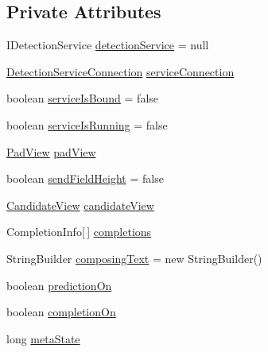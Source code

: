 \subsection*{Private Attributes}
\begin{DoxyCompactItemize}
\item 
IDetectionService \hyperlink{classch_1_1zhaw_1_1ba10__bsha__1_1_1ime_1_1HandwritingIME_adb6575df144036d95d8e2fb029218c4d}{detectionService} = null
\item 
\hyperlink{classch_1_1zhaw_1_1ba10__bsha__1_1_1ime_1_1HandwritingIME_1_1DetectionServiceConnection}{DetectionServiceConnection} \hyperlink{classch_1_1zhaw_1_1ba10__bsha__1_1_1ime_1_1HandwritingIME_a327839f818f5782ff037e64ff386045f}{serviceConnection}
\item 
boolean \hyperlink{classch_1_1zhaw_1_1ba10__bsha__1_1_1ime_1_1HandwritingIME_a9d9ecc20c8af30a04dfaa832cd7da89b}{serviceIsBound} = false
\item 
boolean \hyperlink{classch_1_1zhaw_1_1ba10__bsha__1_1_1ime_1_1HandwritingIME_a2ec39f4494a222882ffb6a09419accd8}{serviceIsRunning} = false
\item 
\hyperlink{classch_1_1zhaw_1_1ba10__bsha__1_1_1ime_1_1PadView}{PadView} \hyperlink{classch_1_1zhaw_1_1ba10__bsha__1_1_1ime_1_1HandwritingIME_a1dd0d971c8e7acd463435307af0b6bcd}{padView}
\item 
boolean \hyperlink{classch_1_1zhaw_1_1ba10__bsha__1_1_1ime_1_1HandwritingIME_a25083961cde3a46e105a3ad13c0f557b}{sendFieldHeight} = false
\item 
\hyperlink{classch_1_1zhaw_1_1ba10__bsha__1_1_1ime_1_1CandidateView}{CandidateView} \hyperlink{classch_1_1zhaw_1_1ba10__bsha__1_1_1ime_1_1HandwritingIME_af7d4919c3faf26a9459310f8102d4d80}{candidateView}
\item 
CompletionInfo\mbox{[}$\,$\mbox{]} \hyperlink{classch_1_1zhaw_1_1ba10__bsha__1_1_1ime_1_1HandwritingIME_a8df4f47c35084abc7bf31d65b248c5be}{completions}
\item 
StringBuilder \hyperlink{classch_1_1zhaw_1_1ba10__bsha__1_1_1ime_1_1HandwritingIME_adb09682281dc4daa50613d97d28c6dfd}{composingText} = new StringBuilder()
\item 
boolean \hyperlink{classch_1_1zhaw_1_1ba10__bsha__1_1_1ime_1_1HandwritingIME_a84134f9987fa827825135caaac882b26}{predictionOn}
\item 
boolean \hyperlink{classch_1_1zhaw_1_1ba10__bsha__1_1_1ime_1_1HandwritingIME_ab1ce22088e636ff9cd28e7c5d062471a}{completionOn}
\item 
long \hyperlink{classch_1_1zhaw_1_1ba10__bsha__1_1_1ime_1_1HandwritingIME_a5fcd0c226a96c4fb7549fba822b49d2a}{metaState}

\end{DoxyCompactItemize}
